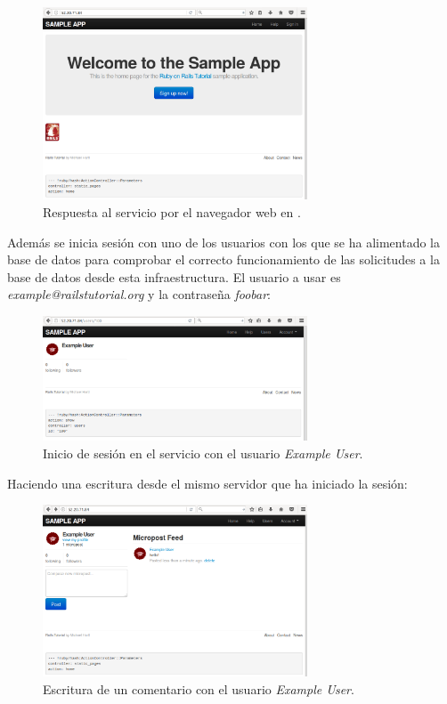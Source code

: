 \begin{figure}[H]
\centering
\includegraphics[width=0.7\textwidth]{images/figures/web-confd.png}
\caption{Respuesta al servicio por el navegador web en .}
\end{figure}

Además se inicia sesión con uno de los usuarios con los que se ha alimentado la base de datos para comprobar el correcto funcionamiento de las solicitudes a la base de datos desde esta infraestructura. El usuario a usar es \textit{example@railstutorial.org} y la contraseña \textit{foobar}:

\begin{figure}[H]
\centering
\includegraphics[width=0.7\textwidth]{images/figures/login-confd.png}
\caption{Inicio de sesión en el servicio con el usuario \textit{Example User}.}
\end{figure}

Haciendo una escritura desde el mismo servidor que ha iniciado la sesión:

\begin{figure}[H]
\centering
\includegraphics[width=0.7\textwidth]{images/figures/post-confd.png}
\caption{Escritura de un comentario con el usuario \textit{Example User}.}
\end{figure}

